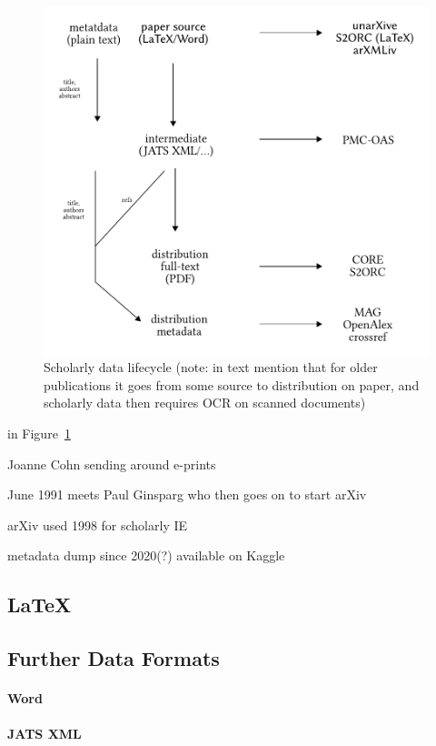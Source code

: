 \begin{figure}[bt]
  \centering
  \includegraphics[width=0.7\linewidth]{figures/foundations/scholarly_data_lifecycle_dummy}
  \caption[Scholarly data lifecycle]{Scholarly data lifecycle (note: in text mention that for older publications it goes from some source to distribution on paper, and scholarly data then requires OCR on scanned documents)}
  \label{fig:foundations-datalifecycle}
\end{figure}

in Figure~\ref{fig:foundations-datalifecycle}

Joanne Cohn sending around e-prints~\cite{Feder2021,Turner2012}

June 1991 meets Paul Ginsparg who then goes on to start arXiv~\cite{Ginsparg2011a,Ginsparg2011}

arXiv used 1998 for scholarly IE~\cite{Nanba1998}

metadata dump since 2020(?) available on Kaggle~\cite{arxiv_kaggle_dataset}

\subsection{\LaTeX}

\subsection{Further Data Formats}

\paragraph{Word}

\paragraph{JATS XML}

